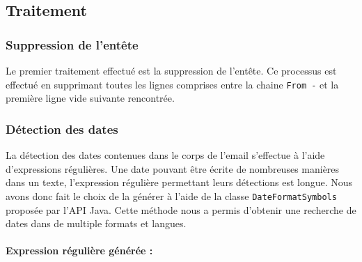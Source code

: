 \documentclass[a4paper,french,10pt]{article}
\begin{document}
\subsection{Traitement}

\subsubsection{Suppression de l'entête}
Le premier traitement effectué est la suppression de l'entête. Ce processus est effectué en supprimant toutes les lignes comprises entre la chaine \og \texttt{From -} \fg{} et la première ligne vide suivante rencontrée.

\subsubsection{Détection des dates}
La détection des dates contenues dans le corps de l'email s'effectue à l'aide d'expressions régulières. Une date pouvant être écrite de nombreuses manières dans un texte, l'expression régulière permettant leurs détections est longue. Nous avons donc fait le choix de la générer à l'aide de la classe \texttt{DateFormatSymbols} proposée par l'API Java. Cette méthode nous a permis d'obtenir une recherche de dates dans de multiple formats et langues.

\paragraph*{Expression régulière générée :}
\end{document}

